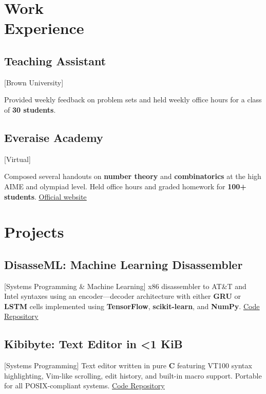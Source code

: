 \documentclass{mycv}
\begin{document}
\section{Work \\ Experience}

\subsection{Teaching Assistant}[Brown University]
\begin{positions}
\end{positions}
Provided weekly feedback on problem sets and held weekly office hours for a class of \textbf{30 students}.

\subsection{Everaise Academy}[Virtual]
\begin{positions}
\end{positions}

Composed several handouts on \textbf{number theory} and \textbf{combinatorics} at the high AIME and olympiad level. Held office hours and graded homework for \textbf{100+ students}. \href{everaise.org}{\underline{Official website}}

\section{Projects}

\subsection{DisasseML: Machine Learning Disassembler}[Systems Programming \& Machine Learning]
x86 disassembler to AT\&T and Intel syntaxes using an encoder—decoder architecture with either \textbf{GRU} or \textbf{LSTM} cells implemented using \textbf{TensorFlow}, \textbf{scikit-learn}, and \textbf{NumPy}. \href{https://github.com/alizma/disasseML}{\underline{Code Repository}}

\subsection{Kibibyte: Text Editor in <1 KiB}[Systems Programming]
Text editor written in pure \textbf{C} featuring VT100 syntax highlighting, Vim-like scrolling, edit history, and built-in macro support. Portable for all POSIX-compliant systems. \href{https://github.com/alizma/kilo_text_editor}{\underline{Code Repository}}
\end{document}
